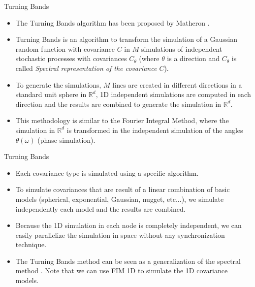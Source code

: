 
\begin{frame}{Turning Bands}
  \begin{itemize}
  	 \item The Turning Bands algorithm has been proposed by Matheron \cite{matheron1973intrinsic}.
    \item Turning Bands is an algorithm to transform the simulation of a Gaussian random function with covariance $C$ in $M$ simulations of independent stochastic processes with covariances $C_\theta$ (where $\theta$ is a direction and $C_\theta$ is called \textit{Spectral representation of the covariance $C$}).
    \item To generate the simulations, $M$ lines are created in different directions in a standard unit sphere in $\mathbb{R}^d$, 1D independent simulations are computed in each direction and the results are combined to generate the simulation in $\mathbb{R}^d$. 
    \item This methodology is similar to the Fourier Integral Method, where the simulation in $\mathbb{R}^d$ is transformed in the independent simulation of the angles $\theta(\omega)$ (phase simulation).
  \end{itemize}

\end{frame}

\begin{frame}{Turning Bands}
\begin{itemize}
\item Each covariance type is simulated using a specific algorithm. \cite{emery2006tbsim}
\item To simulate covariances that are result of a linear combination of basic models (spherical, exponential, Gaussian, nugget, etc...), we simulate independently each model and the results are combined.
\item Because the 1D simulation in each node is completely independent, 
we can easily parallelize the simulation in space without any synchronization technique. 
\item The Turning Bands method can be seen as a generalization of the spectral method \cite{lantuejoul2013geostatistical}. Note that we can use FIM 1D to simulate the 1D covariance models. 
\end{itemize}
\end{frame}

